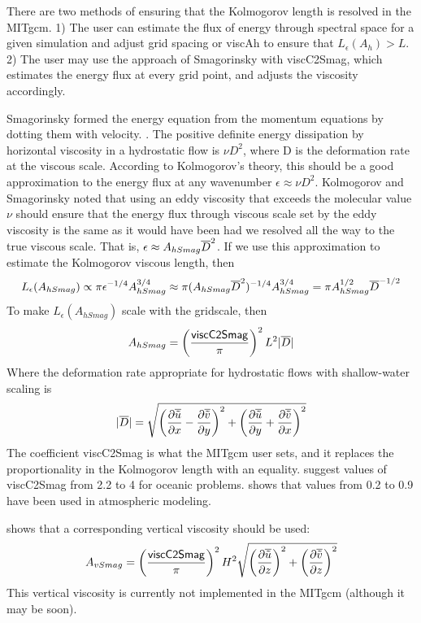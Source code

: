 There are two methods of ensuring that the Kolmogorov length is
resolved in the MITgcm.  1) The user can estimate the flux of energy
through spectral space for a given simulation and adjust grid spacing
or {\sf viscAh} to ensure that $L_\epsilon(A_h)>L$.  2) The user may
use the approach of Smagorinsky with {\sf viscC2Smag}, which estimates
the energy flux at every grid point, and adjusts the viscosity
accordingly.

Smagorinsky formed the energy equation from the momentum equations by
dotting them with velocity.  \citep[There are some complications when
using the hydrostatic approximation, see][]{Smagorinsky93}.  The
positive definite energy dissipation by horizontal viscosity in a
hydrostatic flow is $\nu D^2$, where D is the deformation rate at the
viscous scale.  According to Kolmogorov's theory, this should be a
good approximation to the energy flux at any wavenumber
$\epsilon\approx\nu D^2$.  Kolmogorov and Smagorinsky noted that using
an eddy viscosity that exceeds the molecular value $\nu$ should ensure
that the energy flux through viscous scale set by the eddy viscosity
is the same as it would have been had we resolved all the way to the
true viscous scale.  That is, $\epsilon\approx A_{hSmag} \overline{D}^2$.  If
we use this approximation to estimate the Kolmogorov viscous length,
then
\begin{eqnarray}
L_\epsilon(A_{hSmag})\propto\pi\epsilon^{-1/4}A_{hSmag}^{3/4}\approx\pi(A_{hSmag} \overline{D}^2)^{-1/4}A_{hSmag}^{3/4}=\pi A_{hSmag}^{1/2}\overline{D}^{-1/2}
\end{eqnarray}
To make $L_\epsilon(A_{hSmag})$ scale with the gridscale, then
\begin{eqnarray}
A_{hSmag}=\left(\frac{{\sf viscC2Smag}}{\pi}\right)^2L^2|\overline{D}|
\end{eqnarray}
Where the deformation rate appropriate for hydrostatic flows with
shallow-water scaling is
\begin{eqnarray}
|\overline{D}|=\sqrt{\left({\frac{\partial{\overline{{\tilde u}}}}{\partial x}}-{\frac{\partial{\overline{{\tilde v}}}}{\partial y}}\right)^2+\left({\frac{\partial{\overline{{\tilde u}}}}{\partial y}}+{\frac{\partial{\overline{{\tilde v}}}}{\partial x}}\right)^2}
\end{eqnarray}
The coefficient {\sf viscC2Smag} is what the MITgcm user sets, and it
replaces the proportionality in the Kolmogorov length with an
equality.  \citet{grha00} suggest values of {\sf viscC2Smag} from 2.2
to 4 for oceanic problems.  \citet{Smagorinsky93} shows that values
from 0.2 to 0.9 have been used in atmospheric modeling.

\citet{Smagorinsky93} shows that a corresponding vertical viscosity
should be used:
\begin{eqnarray}
A_{vSmag}=\left(\frac{{\sf viscC2Smag}}{\pi}\right)^2H^2\sqrt{\left({\frac{\partial{\overline{{\tilde u}}}}{\partial z}}\right)^2+\left({\frac{\partial{\overline{{\tilde v}}}}{\partial z}}\right)^2}\nonumber
\end{eqnarray}
This vertical viscosity is currently not implemented in the MITgcm
(although it may be soon).

